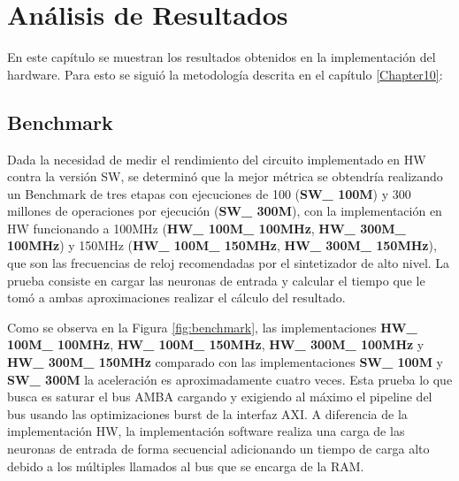 
\chapter{Análisis de Resultados} %
\label{Chapter13}

En este capítulo se muestran los resultados obtenidos en la implementación del hardware. Para esto se siguió la metodología descrita en el capítulo \ref{Chapter10}: 
 
 \section{Benchmark}
Dada la necesidad de medir el rendimiento del circuito implementado en HW contra la versión SW, se determinó que la mejor métrica se obtendría realizando un Benchmark de tres etapas con ejecuciones de 100 (\textbf{SW\_ 100M}) y 300 millones de operaciones por ejecución (\textbf{SW\_ 300M}), con la implementación en HW funcionando a 100MHz (\textbf{HW\_ 100M\_ 100MHz}, \textbf{HW\_ 300M\_ 100MHz}) y 150MHz (\textbf{HW\_ 100M\_ 150MHz}, \textbf{HW\_ 300M\_ 150MHz}), que son las frecuencias de reloj recomendadas por el sintetizador de alto nivel. La prueba consiste en cargar las neuronas de entrada y calcular el tiempo que le tomó a ambas aproximaciones realizar el cálculo del resultado.

Como se observa en la Figura \ref{fig:benchmark}, las implementaciones \textbf{HW\_ 100M\_ 100MHz}, \textbf{HW\_ 100M\_ 150MHz}, \textbf{HW\_ 300M\_ 100MHz} y \textbf{HW\_ 300M\_ 150MHz} comparado con las implementaciones \textbf{SW\_ 100M} y \textbf{SW\_ 300M} la aceleración es aproximadamente cuatro veces. Esta prueba lo que busca es saturar el bus AMBA cargando y exigiendo al máximo el pipeline del bus usando las optimizaciones burst de la interfaz AXI. A diferencia de la implementación HW, la implementación software realiza una carga de las neuronas de entrada de forma secuencial adicionando un tiempo de carga alto debido a los múltiples llamados al bus que se encarga de la RAM.


